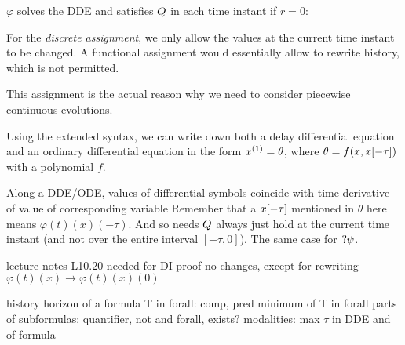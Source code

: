     $\varphi$ solves the DDE and satisfies $Q$ in each time instant
    if $r=0$: 

    For the \emph{discrete assignment}, we only allow the values at the current time instant to be changed. A functional assignment would essentially allow to rewrite history, which is not permitted.

    This assignment is the actual reason why we need to consider piecewise continuous evolutions.

    


    Using the extended syntax, we can write down both a delay differential equation and an ordinary differential equation in the form $\D{x}=\theta$, where $\theta=f(x,x[-\tau])$ with a polynomial $f$.

    Along a DDE/ODE, values of differential symbols coincide with time derivative of value of corresponding variable
    Remember that a $x[-\tau]$ mentioned in $\theta$ here means $\varphi(t)(x)(-\tau)$.
    And so needs $Q$ always just hold at the current time instant (and not over the entire interval $[-\tau,0]$). The same case for $?\psi$.

    \begin{lemma}
        lecture notes L10.20
        needed for DI proof
        no changes, except for rewriting $\varphi(t)(x)\rightarrow\varphi(t)(x)(0)$
    \end{lemma}


    \begin{definition}
        history horizon of a \ddL formula
        T in forall: comp, pred
        minimum of T in forall parts of subformulas: quantifier, not and
        forall, exists?
        modalities: max $\tau$ in DDE and of formula
    \end{definition}

